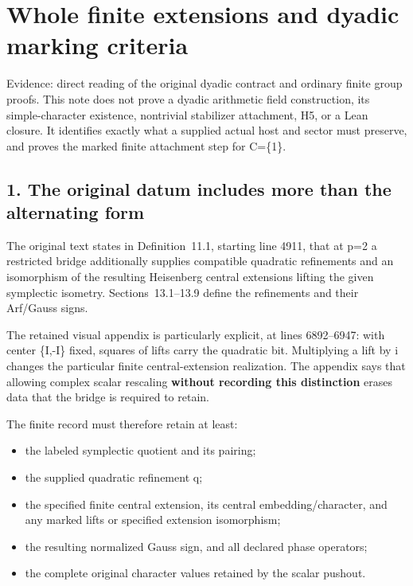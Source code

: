 \clearpage
\section{Whole finite extensions and dyadic marking criteria}\label{app:dyadic_markings}

Evidence: direct reading of the original dyadic contract and ordinary
finite group proofs. This note does not prove a dyadic arithmetic field
construction, its simple-character existence, nontrivial stabilizer
attachment, H5, or a Lean closure. It identifies exactly what a supplied
actual host and sector must preserve, and proves the marked finite
attachment step for C=\{1\}.

\hypertarget{dyadic_markings-the-original-datum-includes-more-than-the-alternating-form}{%
\subsection{1. The original datum includes more than the alternating
form}\label{dyadic_markings-the-original-datum-includes-more-than-the-alternating-form}}

The original text
 states in
Definition~11.1, starting line 4911, that at p=2 a restricted bridge
additionally supplies compatible quadratic refinements and an
isomorphism of the resulting Heisenberg central extensions lifting the
given symplectic isometry. Sections~13.1--13.9 define the refinements and
their Arf/Gauss signs.

The retained visual appendix is particularly explicit, at
lines 6892--6947: with center \{I,-I\} fixed, squares of lifts carry the
quadratic bit. Multiplying a lift by i changes the particular finite
central-extension realization. The appendix says that allowing complex
scalar rescaling \textbf{without recording this distinction} erases data
that the bridge is required to retain.

The finite record must therefore retain at least:

\begin{itemize}
\tightlist
\item
  the labeled symplectic quotient and its pairing;
\item
  the supplied quadratic refinement q;
\item
  the specified finite central extension, its central
  embedding/character, and any marked lifts or specified extension
  isomorphism;
\item
  the resulting normalized Gauss sign, and all declared phase operators;
\item
  the complete original character values retained by the scalar pushout.
\end{itemize}

